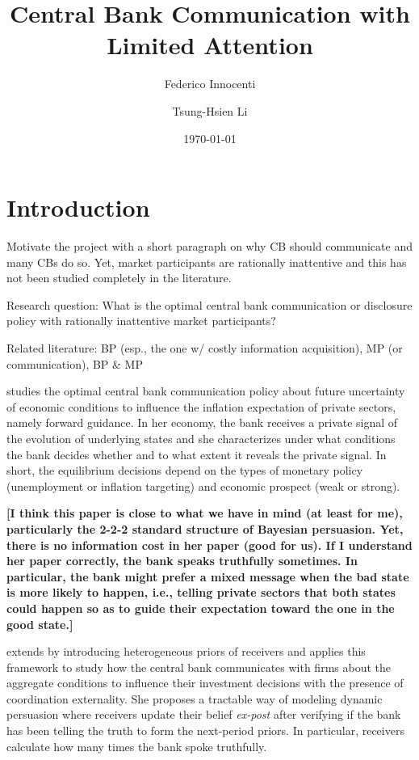 \documentclass[12pt,a4paper]{article}
\title{Central Bank Communication with Limited Attention}
\author{Federico Innocenti \and Tsung-Hsien Li}
\date{\today}
\begin{document}
\setlength{\parskip}{2mm}

\maketitle

\section{Introduction}

Motivate the project with a short paragraph on why CB should communicate and many CBs do so. Yet, market participants are rationally inattentive and this has not been studied completely in the literature.

Research question: What is the optimal central bank communication or disclosure policy with rationally inattentive market participants?

Related literature: BP (esp., the one w/ costly information acquisition), MP (or communication), BP \& MP

\cite{Ko2022} studies the optimal central bank communication policy about future uncertainty of economic conditions to influence the inflation expectation of private sectors, namely forward guidance. In her economy, the bank receives a private signal of the evolution of underlying states and she characterizes under what conditions the bank decides whether and to what extent it reveals the private signal. In short, the equilibrium decisions depend on the types of monetary policy (unemployment or inflation targeting) and economic prospect (weak or strong). 

\textbf{[I think this paper is close to what we have in mind (at least for me), particularly the 2-2-2 standard structure of Bayesian persuasion. Yet, there is no information cost in her paper (good for us). If I understand her paper correctly, the bank speaks truthfully sometimes. In particular, the bank might prefer a mixed message when the bad state is more likely to happen, i.e., telling private sectors that both states could happen so as to guide their expectation toward the one in the good state.]}

\cite{Herbert2021} extends \cite{KG2011} by introducing heterogeneous priors of receivers and applies this framework to study how the central bank communicates with firms about the aggregate conditions to influence their investment decisions with the presence of coordination externality. She proposes a tractable way of modeling dynamic persuasion where receivers update their belief \textit{ex-post} after verifying if the bank has been telling the truth to form the next-period priors. In particular, receivers calculate how many times the bank spoke truthfully.
\end{document}
